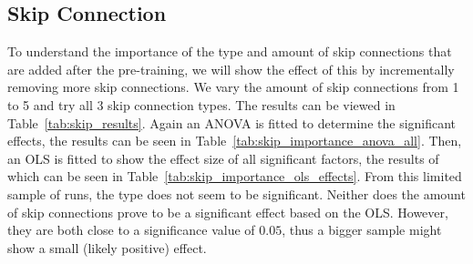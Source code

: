 \subsection{Skip Connection}
To understand the importance of the type and amount of skip connections that are added after the pre-training, we will show the effect of this by incrementally removing more skip connections. We vary the amount of skip connections from 1 to 5 and try all 3 skip connection types. The results can be viewed in Table~\ref{tab:skip_results}.
Again an ANOVA is fitted to determine the significant effects, the results can be seen in Table~\ref{tab:skip_importance_anova_all}. Then, an OLS is fitted to show the effect size of all significant factors, the results of which can be seen in Table~\ref{tab:skip_importance_ols_effects}. From this limited sample of runs, the type does not seem to be significant. Neither does the amount of skip connections prove to be a significant effect based on the OLS. However, they are both close to a significance value of $0.05$, thus a bigger sample might show a small (likely positive) effect.




